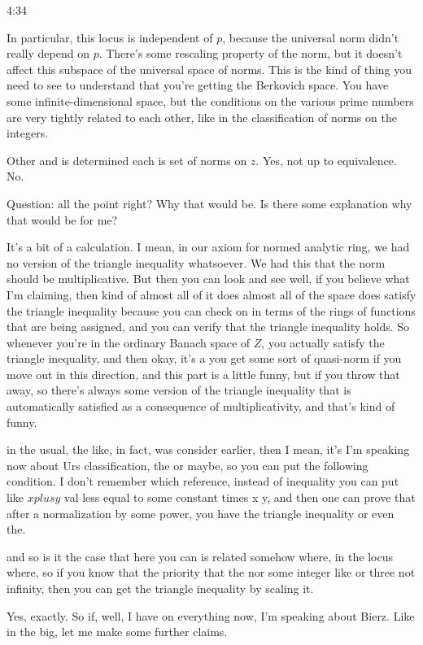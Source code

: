 \begin{unfinished}{4:34}
\begin{example}
\begin{example}
\begin{example}
In particular, this locus is independent of $p$, because the universal norm didn't really depend on $p$. There's some rescaling property of the norm, but it doesn't affect this subspace of the universal space of norms. This is the kind of thing you need to see to understand that you're getting the Berkovich space. You have some infinite-dimensional space, but the conditions on the various prime numbers are very tightly related to each other, like in the classification of norms on the integers.

Other and is determined each is set of norms on $z$. Yes, not up to equivalence. No.

Question: all the point right? Why that would be. Is there some explanation why that would be for me?

It's a bit of a calculation. I mean, in our axiom for normed analytic ring, we had no version of the triangle inequality whatsoever. We had this that the norm should be multiplicative. But then you can look and see well, if you believe what I'm claiming, then kind of almost all of it does almost all of the space does satisfy the triangle inequality because you can check on in terms of the rings of functions that are being assigned, and you can verify that the triangle inequality holds. So whenever you're in the ordinary Banach space of $Z$, you actually satisfy the triangle inequality, and then okay, it's a you get some sort of quasi-norm if you move out in this direction, and this part is a little funny, but if you throw that away, so there's always some version of the triangle inequality that is automatically satisfied as a consequence of multiplicativity, and that's kind of funny.

in the usual, the like, in fact, was consider earlier, then I mean, it's I'm speaking now about Urs classification, the or maybe, so you can put the following condition. I don't remember which reference, instead of inequality you can put like $x plus y$ val less equal to some constant times x y, and then one can prove that after a normalization by some power, you have the triangle inequality or even the.

and so is it the case that here you can is related somehow where, in the locus where, so if you know that the priority that the nor some integer like or three not infinity, then you can get the triangle inequality by scaling it.

Yes, exactly. So if, well, I have on everything now, I'm speaking about Bierz. Like in the big, let me make some further claims.


\end{example}
\end{example}
\end{example}
\end{unfinished}

